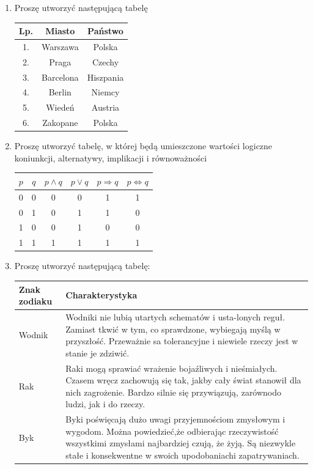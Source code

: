 \documentclass[12 pt, a4paper]{article}
\author {Konrad Pagacz}
\begin{document}
\begin{enumerate}

\item Proszę utworzyć następującą tabelę

	\begin{tabular} { | c | c | c |} \hline \hline
	\textbf{Lp.}	&	\textbf{Miasto}	&	\textbf{Państwo}	\\ \hline
	1.	&	Warszawa	&	Polska \\ \hline
	2.	&	Praga	&	Czechy	\\ \hline
	3.	&	Barcelona	&	Hiszpania	\\ \hline
	4.	&	Berlin	&	Niemcy	\\ \hline
	5.	&	Wiedeń	&	Austria	\\ \hline
	6.	&	Zakopane	&	Polska	\\ 
		\hline \hline
	\end{tabular}

\item Proszę utworzyć tabelę, w której będą umieszczone wartości logiczne koniunkcji, alternatywy, implikacji i równoważności

		\begin{tabular} {| c | c | c | c | c | c |} \hline
		$p$	&	$q$	&	$p \wedge q$	&	$p \vee q$	&	$p \Rightarrow q$	&	$p \Leftrightarrow q$ \\ \hline
		0	&	0	&	0	&	0	&	1	&	1	\\ \hline
		0	&	1	&	0	&	1	&	1	&	0	\\ \hline
		1	&	0	&	0	&	1	&	0	&	0	\\ \hline
		1	&	1	&	1	&	1	&	1	&	1	\\ \hline
		\end{tabular}
		
\item Proszę utworzyć następującą tabelę:

	\begin{tabular}	{| p{2.5cm} | p{8cm} |} \hline
	Znak zodiaku	&	Charakterystyka	\\	\hline
	Wodnik	&	Wodniki nie lubią utartych schematów i usta-lonych reguł. Zamiast tkwić w tym, co sprawdzone, wybiegają myślą w przyszłość. 	Przeważnie sa tolerancyjne i niewiele rzeczy jest w stanie je zdziwić. \\ \hline
	Rak	&	Raki mogą sprawiać wrażenie bojaźliwych i nieśmiałych. Czasem wręcz zachowują się tak, jakby cały świat stanowił dla nich zagrożenie. Bardzo silnie się przywiązują, zarównodo ludzi, jak i do rzeczy. \\ \hline
	Byk	&	Byki poświęcają dużo uwagi przyjemnościom zmysłowym i wygodom. Można powiedzieć,że odbierając rzeczywistość wszystkimi zmysłami najbardziej czują, że żyją. Są niezwykle stałe i konsekwentne w swoich upodobaniachi zapatrywaniach. \\ \hline
	\end{tabular}


\end{enumerate}
\end{document}
